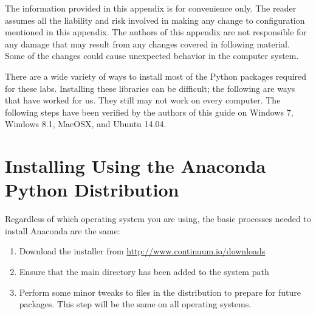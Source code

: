 \label{pythoninstall}


\begin{warn}
The information provided in this appendix is for convenience only.
The reader assumes all the liability and risk involved in making any change to configuration mentioned in this appendix.
The authors of this appendix are not responsible for any damage that may result from any changes covered in following material.
Some of the changes could cause unexpected behavior in the computer system.
\end{warn}

There are a wide variety of ways to install most of the Python packages required for these labs.
Installing these libraries can be difficult; the following are ways that have worked for us.
They still may not work on every computer. The following steps have been verified by the authors of this guide on Windows 7, Windows 8.1, MacOSX, and Ubuntu 14.04.

\section*{Installing Using the Anaconda Python Distribution}

Regardless of which operating system you are using, the basic processes needed to install Anaconda are the same:
\begin{enumerate}
\item Download the installer from \url{http://www.continuum.io/downloads}
\item Ensure that the main  directory has been added to the system path
\item Perform some minor tweaks to files in the distribution to prepare for future packages. This step will be the same on all operating systems.
\end{enumerate}

